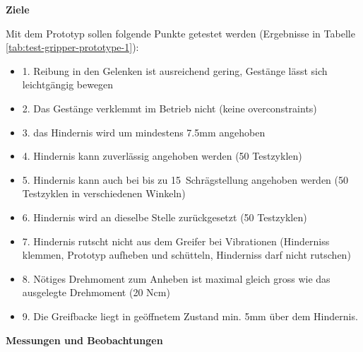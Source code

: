 \textbf{Ziele}

Mit dem Prototyp sollen folgende Punkte getestet werden (Ergebnisse in Tabelle \ref{tab:test-gripper-prototype-1}):
\begin{itemize}
    \item 1. Reibung in den Gelenken ist ausreichend gering, Gestänge lässt sich leichtgängig bewegen
    \item 2. Das Gestänge verklemmt im Betrieb nicht (keine overconstraints)
    \item 3. das Hindernis wird um mindestens 7.5mm angehoben
    \item 4. Hindernis kann zuverlässig angehoben werden (50 Testzyklen)
    \item 5. Hindernis kann auch bei bis zu 15\textdegree\ Schrägstellung angehoben werden (50 Testzyklen in verschiedenen Winkeln)
    \item 6. Hindernis wird \pm 2mm an dieselbe Stelle zurückgesetzt (50 Testzyklen)
    \item 7. Hindernis rutscht nicht aus dem Greifer bei Vibrationen (Hinderniss klemmen, Prototyp aufheben und schütteln, Hinderniss darf nicht rutschen)
    \item 8. Nötiges Drehmoment zum Anheben ist maximal gleich gross wie das ausgelegte Drehmoment (20 Ncm)
    \item 9. Die Greifbacke liegt in geöffnetem Zustand min. 5mm über dem Hindernis.
\end{itemize}
\newpage

\textbf{Messungen und Beobachtungen}

